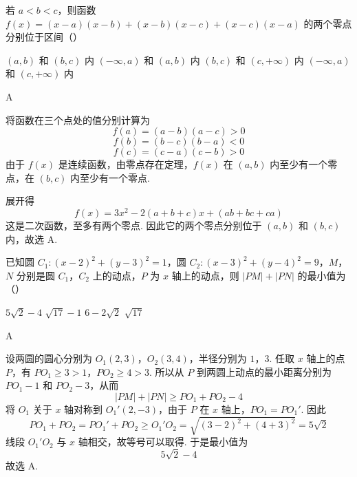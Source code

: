 \begin{problem}
若 \(a < b < c\)，则函数 \(f(x) = (x - a)(x - b) + (x - b)(x - c) + (x - c)(x - a)\) 的两个零点分别位于区间（\quad）

\choices
    {\((a, b)\) 和 \((b, c)\) 内}
    {\((-\infty, a)\) 和 \((a, b)\) 内}
    {\((b, c)\) 和 \((c, +\infty)\) 内}
    {\((-\infty, a)\) 和 \((c, +\infty)\) 内}

\begin{answer}
A
\end{answer}

\begin{solution}
将函数在三个点处的值分别计算为
\[
f(a)=(a-b)(a-c)>0
\]
\[
f(b)=(b-c)(b-a)<0
\]
\[
f(c)=(c-a)(c-b)>0
\]
由于 \(f(x)\) 是连续函数，由零点存在定理，\(f(x)\) 在 \((a,b)\) 内至少有一个零点，在 \((b,c)\) 内至少有一个零点.

展开得
\[
f(x)=3x^2-2(a+b+c)x+(ab+bc+ca)
\]
这是二次函数，至多有两个零点. 因此它的两个零点分别位于 \((a,b)\) 和 \((b,c)\) 内，故选 A.
\end{solution}
\end{problem}

\begin{problem}
已知圆 \(C_{1}: (x - 2)^{2} + (y - 3)^{2} = 1\)，圆 \(C_{2}: (x - 3)^{2} + (y - 4)^{2} = 9\)，\(M\)，\(N\) 分别是圆 \(C_{1}\)，\(C_{2}\) 上的动点，\(P\) 为 \(x\) 轴上的动点，则 \(|PM| + |PN|\) 的最小值为（\quad）

\choices
    {\(5\sqrt{2} - 4\)}
    {\(\sqrt{17} - 1\)}
    {\(6 - 2\sqrt{2}\)}
    {\(\sqrt{17}\)}

\begin{answer}
A
\end{answer}

\begin{solution}
设两圆的圆心分别为 \(O_1(2,3)\)，\(O_2(3,4)\)，半径分别为 \(1\)，\(3\). 任取 \(x\) 轴上的点 \(P\)，有
\(PO_1\geqslant3>1\)，\(PO_2\geqslant4>3\).
所以从 \(P\) 到两圆上动点的最小距离分别为 \(PO_1-1\) 和 \(PO_2-3\)，从而
\[
|PM|+|PN|\geqslant PO_1+PO_2-4
\]
将 \(O_1\) 关于 \(x\) 轴对称到 \(O_1'(2,-3)\)，由于 \(P\) 在 \(x\) 轴上，\(PO_1=PO_1'\). 因此
\[
PO_1+PO_2=PO_1'+PO_2\geqslant O_1'O_2
=\sqrt{(3-2)^2+(4+3)^2}=5\sqrt{2}
\]
线段 \(O_1'O_2\) 与 \(x\) 轴相交，故等号可以取得. 于是最小值为
\[
5\sqrt{2}-4
\]
故选 A.
\end{solution}
\end{problem}

